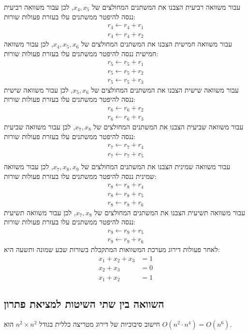 \documentclass[12pt,leqno]{article}
\theoremstyle{theoremdd}
\begin{document}
עבור משוואה רביעית הצבנו 
את המשתנים המחולצים של 
$x_4, x_5$,
לכן עבור משוואה רביעית ננסה להיפטר ממשתנים עלו בעזרת פעולות שורות:
\begin{align*} 
r_4 \leftarrow r_4 + r_1\\
r_4 \leftarrow r_4 + r_2
\end{align*} 
עבור משוואה חמישית הצבנו 
את המשתנים המחולצים של 
$x_4, x_5, x_6$,
לכן עבור משוואה חמישית ננסה להיפטר ממשתנים עלו בעזרת פעולות שורות:
\begin{align*} 
    r_5 \leftarrow r_5 + r_1 \\
    r_5 \leftarrow r_5 + r_2 \\
    r_5 \leftarrow r_5 + r_3
\end{align*} 
עבור משוואה שישית הצבנו 
את המשתנים המחולצים של 
$x_5, x_6$,
לכן עבור משוואה שישית ננסה להיפטר ממשתנים עלו בעזרת פעולות שורות:
\begin{align*} 
    r_6 \leftarrow r_6 + r_2 \\
    r_6 \leftarrow r_6 + r_3
\end{align*}
עבור משוואה שביעית הצבנו 
את המשתנים המחולצים של 
$x_7, x_8$,
לכן עבור משוואה שביעית ננסה להיפטר ממשתנים עלו בעזרת פעולות שורות:
\begin{align*} 
    r_7 \leftarrow r_7 + r_4 \\
    r_7 \leftarrow r_7 + r_5 \\
\end{align*} 
עבור משוואה שמינית הצבנו 
את המשתנים המחולצים של 
$x_7, x_8, x_9$,
לכן עבור משוואה שמינית ננסה להיפטר ממשתנים עלו בעזרת פעולות שורות:
\begin{align*} 
    r_8 \leftarrow r_8 + r_4 \\
    r_8 \leftarrow r_8 + r_5 \\
    r_8 \leftarrow r_8 + r_6
\end{align*} 
עבור משוואה תשיעית הצבנו 
את המשתנים המחולצים של 
$x_7, x_8$,
לכן עבור משוואה תשיעית ננסה להיפטר ממשתנים עלו בעזרת פעולות שורות:
\begin{align*} 
    r_9 \leftarrow r_9 + r_5 \\
    r_9 \leftarrow r_9 + r_6
\end{align*}
לאחר פעולות דירוג 
מערכת המשוואות המתקבלת בשורות 
שבע שמונה ותשעה היא:
\begin{align*} 
    x_1 + x_2 + x_3 &= 1\\
    x_2 + x_3 &= 0 \\
    x_1 + x_2 &= 1
\end{align*}

\subsection{השוואה בין שתי השיטות למציאת פתרון}
חישוב סיבוכיות
של דירוג מטריצה 
כללית
בגודל 
$n^2 \times n^2$
הוא 
$O(n^2 \cdot n^4) = O(n^6)$.
\end{document}
